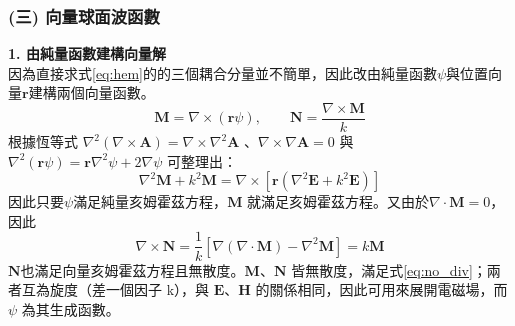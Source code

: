 \subsubsection{(三) 向量球面波函數}
\textbf{1. 由純量函數建構向量解} \\
因為直接求式\eqref{eq:hem}的的三個耦合分量並不簡單，因此改由純量函數$\psi$與位置向量$\mathbf{r}$建構兩個向量函數。
\begin{equation}
    \mathbf{M} = \nabla \times (\mathbf{r} \psi), \qquad \mathbf{N} = \frac{\nabla \times \mathbf{M}}{k}
\end{equation}
根據恆等式 \( \nabla^2 \left( \nabla \times \mathbf{A} \right) =  \nabla \times \nabla^2\mathbf{A} \) 、\(\nabla \times \nabla\mathbf{A} = 0\)
與 \( \nabla^2 \left(\mathbf{r}\psi\right) = \mathbf{r} \nabla^2 \psi + 2 \nabla \psi\) 可整理出：
\begin{equation}
    \nabla^2 \mathbf{M} + k^2 \mathbf{M} = \nabla \times \left[\mathbf{r} \left(\nabla^2\mathbf{E} + k^2 \mathbf{E}\right)\right]
\end{equation}
因此只要$\psi$滿足純量亥姆霍茲方程，$\mathbf{M}$ 就滿足亥姆霍茲方程。又由於\(\nabla \cdot \mathbf{M} = 0\)，因此
\begin{equation}
    \nabla \times \mathbf{N} = \frac{1}{k} \left[ \nabla(\nabla \cdot \mathbf{M}) - \nabla^2 \mathbf{M}\right] = k \mathbf{M}
\end{equation}
$\mathbf{N}$也滿足向量亥姆霍茲方程且無散度。$\mathbf{M}$、$\mathbf{N}$ 皆無散度，滿足式\eqref{eq:no_div}；兩者互為旋度（差一個因子 k），與 $\mathbf{E}$、$\mathbf{H}$ 的關係相同，因此可用來展開電磁場，而$\psi$ 為其生成函數。


